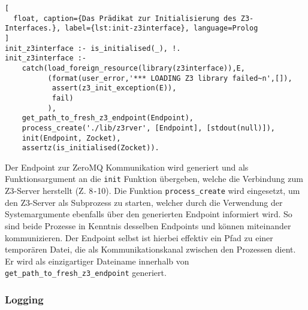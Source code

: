 \begin{lstlisting}[
  float, caption={Das Prädikat zur Initialisierung des Z3-Interfaces.}, label={lst:init-z3interface}, language=Prolog
]
init_z3interface :- is_initialised(_), !.
init_z3interface :-
    catch(load_foreign_resource(library(z3interface)),E,
          (format(user_error,'*** LOADING Z3 library failed~n',[]),
           assert(z3_init_exception(E)),
           fail)
          ),
    get_path_to_fresh_z3_endpoint(Endpoint),
    process_create('./lib/z3rver', [Endpoint], [stdout(null)]),
    init(Endpoint, Zocket),
    assertz(is_initialised(Zocket)).
\end{lstlisting}

Der Endpoint zur ZeroMQ Kommunikation wird generiert
und als Funktionsargument an die \texttt{init} Funktion übergeben, welche die Verbindung zum Z3-Server herstellt (Z. 8\texttt{-}10).
Die Funktion \texttt{process\_create} wird eingesetzt, um den Z3-Server als Subprozess zu starten,
welcher durch die Verwendung der Systemargumente ebenfalls über den generierten Endpoint informiert wird.
So sind beide Prozesse in Kenntnis desselben Endpoints und können miteinander kommunizieren.
Der Endpoint selbst ist hierbei effektiv ein Pfad zu einer temporären Datei, die als Kommunikationskanal zwischen den Prozessen dient.
Er wird als einzigartiger Dateiname innerhalb von \texttt{get\_path\_to\_fresh\_z3\_endpoint} generiert.

\subsubsection{Logging}
\label{subsec:logging}

